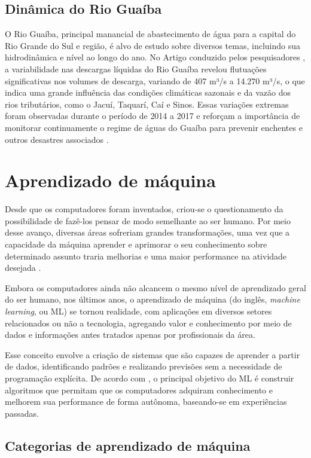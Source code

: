 \subsection{Dinâmica do Rio Guaíba}

O Rio Guaíba, principal manancial de abastecimento de água para a capital do Rio Grande do Sul e região, é alvo de estudo sobre diversos temas, incluindo sua hidrodinâmica e nível ao longo do ano. No Artigo conduzido pelos pesquisadores \cite{andrade2017}, a variabilidade nas descargas líquidas do Rio Guaíba revelou flutuações significativas nos volumes de descarga, variando de 407 m³/s a 14.270 m³/s, o que indica uma grande influência das condições climáticas sazonais e da vazão dos rios tributários, como o Jacuí, Taquarí, Caí e Sinos. Essas variações extremas foram observadas durante o período de 2014 a 2017 e reforçam a importância de monitorar continuamente o regime de águas do Guaíba para prevenir enchentes e outros desastres associados \cite{andrade2017}.

\section{Aprendizado de máquina}

Desde que os computadores foram inventados, criou-se o questionamento da possibilidade de fazê-los pensar de modo semelhante ao ser humano. Por meio desse avanço, diversas áreas sofreriam grandes transformações, uma vez que a capacidade da máquina aprender e aprimorar o seu conhecimento sobre determinado assunto traria melhorias e uma maior performance na atividade desejada \cite{carbonell1983}.

Embora os computadores ainda não alcancem o mesmo nível de aprendizado geral do ser humano, nos últimos anos, o aprendizado de máquina (do inglês, \textit{machine learning}, ou ML) se tornou realidade, com aplicações em diversos setores relacionados ou não a tecnologia, agregando valor e conhecimento por meio de dados e informações antes tratados apenas por profissionais da área.

Esse conceito envolve a criação de sistemas que são capazes de aprender a partir de dados, identificando padrões e realizando previsões sem a necessidade de programação explícita. De acordo com \cite{carbonell1983}, o principal objetivo do ML é construir algoritmos que permitam que os computadores adquiram conhecimento e melhorem sua performance de forma autônoma, baseando-se em experiências passadas.

\subsection{Categorias de aprendizado de máquina}

